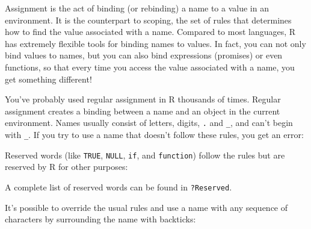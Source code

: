 
Assignment is the act of binding (or rebinding) a name to a value in an
environment. It is the counterpart to scoping, the set of rules that
determines how to find the value associated with a name. Compared to
most languages, R has extremely flexible tools for binding names to
values. In fact, you can not only bind values to names, but you can also
bind expressions (promises) or even functions, so that every time you
access the value associated with a name, you get something different!

You've probably used regular assignment in R thousands of times. Regular
assignment creates a binding between a name and an object in the current
environment. Names usually consist of letters, digits, \texttt{.} and
\texttt{\_}, and can't begin with \texttt{\_}. If you try to use a name
that doesn't follow these rules, you get an error:

\begin{Shaded}
\begin{Highlighting}[]
\StringTok{ }
\end{Highlighting}
\end{Shaded}

Reserved words (like \texttt{TRUE}, \texttt{NULL}, \texttt{if}, and
\texttt{function}) follow the rules but are reserved by R for other
purposes:

\begin{Shaded}
\begin{Highlighting}[]
\StringTok{ }
\end{Highlighting}
\end{Shaded}

A complete list of reserved words can be found in \texttt{?Reserved}.
  

It's possible to override the usual rules and use a name with any
sequence of characters by surrounding the name with backticks:

\begin{Shaded}
\begin{Highlighting}[]
 \NormalTok{<-}\StringTok{ }
\DataTypeTok{:)} \NormalTok{<-}
\DataTypeTok{    } \NormalTok{<-}
\NormalTok{()}
\DataTypeTok{:)}
\end{Highlighting}
\end{Shaded}

